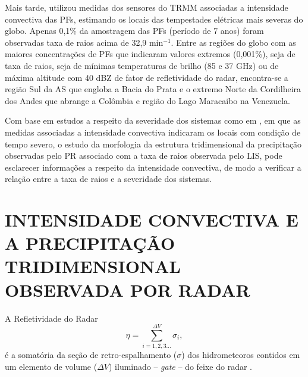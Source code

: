 Mais tarde,  utilizou medidas dos sensores do TRMM associadas a intensidade convectiva das PFs, estimando os locais das tempestades elétricas mais severas do globo. Apenas 0,1\% da amostragem das PFs (período de 7 anos) foram observadas taxa de raios acima de 32,9 min$^{-1}$.  Entre as regiões do globo com as maiores concentrações de PFs que indicaram valores extremos (0,001\%), seja de taxa de raios, seja de mínimas temperaturas de brilho (85 e 37 GHz) ou de máxima altitude com 40 dBZ de fator de refletividade do radar, encontra-se a região Sul da AS que engloba a Bacia do Prata e o extremo Norte da Cordilheira dos Andes que abrange a Colômbia e região do Lago Maracaibo na Venezuela. 

Com base em estudos a respeito da severidade dos sistemas como em , em que as medidas  associadas a intensidade convectiva indicaram os locais com condição de tempo severo, o estudo da morfologia da estrutura tridimensional da precipitação observadas pelo PR associado com a taxa de raios observada pelo LIS, pode esclarecer informações a respeito da intensidade convectiva, de modo a verificar a relação entre a taxa de raios e a severidade dos sistemas. 


\section{INTENSIDADE CONVECTIVA E A PRECIPITAÇÃO TRIDIMENSIONAL OBSERVADA POR RADAR}
\label{introRadar}

A Refletividade do Radar %
\begin{equation}
\eta = \sum_{i=1, 2, 3 ... }^{\Delta V} \sigma_i,
\label{refletividade}
\end{equation}
é a somatória da seção de retro-espalhamento ($\sigma$) dos hidrometeoros contidos em um elemento de volume ($\Delta V$) iluminado -- \textit{gate} -- do feixe do radar \cite{battan1973}.


